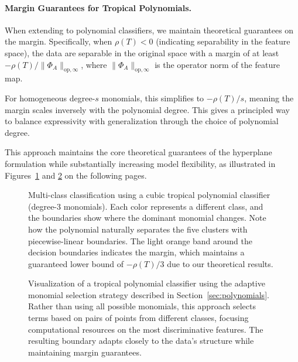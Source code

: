 \documentclass{article}
\begin{document}
\paragraph{Margin Guarantees for Tropical Polynomials.}
When extending to polynomial classifiers, we maintain theoretical guarantees on the margin. Specifically, when $\rho(T)<0$ (indicating separability in the feature space), the data are separable in the original space with a margin of at least $-\rho(T)/\lVert \Phi_A\rVert_{\text{op},\infty}$, where $\lVert \Phi_A\rVert_{\text{op},\infty}$ is the operator norm of the feature map.

For homogeneous degree-$s$ monomials, this simplifies to $-\rho(T)/s$, meaning the margin scales inversely with the polynomial degree. This gives a principled way to balance expressivity with generalization through the choice of polynomial degree.

This approach maintains the core theoretical guarantees of the hyperplane formulation while substantially increasing model flexibility, as illustrated in Figures~\ref{fig:homogeneous_selection} and \ref{fig:adaptive_polynomial} on the following pages.

\newpage

\vspace*{2em}
\begin{figure}[ht!]
    \centering
    \resizebox{0.9\textwidth}{!}{\clipbox{0.15\width{} 0.30\height{} 0.15\width{} 0.30\height{}}{}}
    \caption{Multi-class classification using a cubic tropical polynomial classifier (degree-3 monomials). Each color represents a different class, and the boundaries show where the dominant monomial changes. Note how the polynomial naturally separates the five clusters with piecewise-linear boundaries. The light orange band around the decision boundaries indicates the margin, which maintains a guaranteed lower bound of $-\rho(T)/3$ due to our theoretical results.}
    \label{fig:homogeneous_selection}
\end{figure}
\vspace*{4em}
\begin{figure}[ht!]
    \centering
    \resizebox{0.9\textwidth}{!}{\clipbox{0.15\width{} 0.30\height{} 0.15\width{} 0.30\height{}}{}}
    \caption{Visualization of a tropical polynomial classifier using the adaptive monomial selection strategy described in Section~\ref{sec:polynomials}. Rather than using all possible monomials, this approach selects terms based on pairs of points from different classes, focusing computational resources on the most discriminative features. The resulting boundary adapts closely to the data's structure while maintaining margin guarantees.}
    \label{fig:adaptive_polynomial}
\end{figure}
\vspace*{2em}
\end{document}
